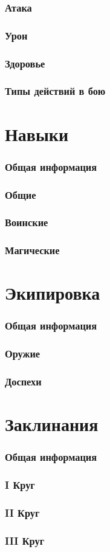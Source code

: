 \documentclass[10pt,twoside,twocolumn,openany]{book}
\begin{document}
\section{Атака}
\lipsum[1]
\section{Урон}
\lipsum[1]
\section{Здоровье}
\lipsum[1]
\section{Типы действий в бою}
\lipsum[1]

\part{Навыки}
\section{Общая информация}
\lipsum[1]
\section{Общие}
\lipsum[1]
\section{Воинские}
\lipsum[1]
\section{Магические}
\lipsum[1]

\part{Экипировка}
\section{Общая информация}
\lipsum[1]
\section{Оружие}
\lipsum[1]
\section{Доспехи}
\lipsum[1]

\part{Заклинания}
\section{Общая информация}
\lipsum[1]
\section{\textrm{I} Круг}
\lipsum[1]
\section{\textrm{II} Круг}
\lipsum[1]
\section{\textrm{III} Круг}
\lipsum[1]
\end{document}
